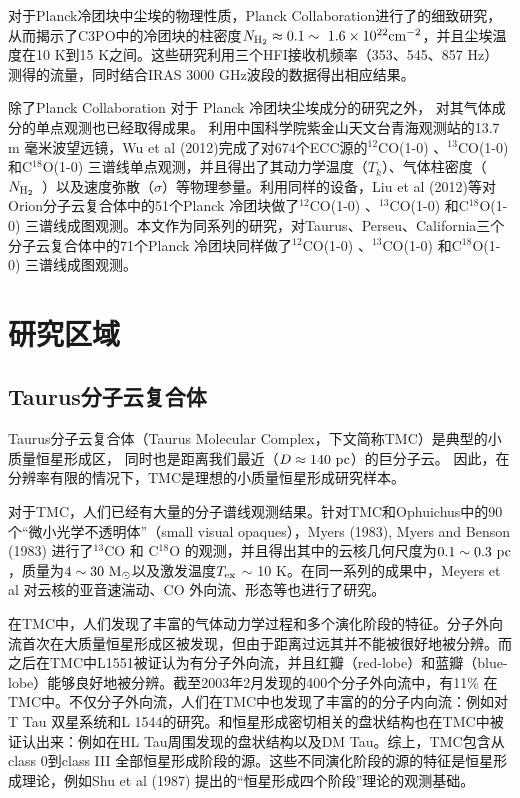 \documentclass[UTF8]{pkuthss}
\newcommand{\cob}{$^{13}$CO }
\newcommand{\coc}{C$^{18}$O }
\newcommand{\coaa}{$^{12}$CO(1-0) }
\newcommand{\cobb}{$^{13}$CO(1-0) }
\newcommand{\cocc}{C$^{18}$O(1-0) }
\newcommand{\texc}{$T_{\rm {ex}}$ }
\newcommand{\nhyd}{$N_{\rm H_2}$\ }
\begin{document}
		对于Planck冷团块中尘埃的物理性质，Planck Collaboration进行了的细致研究，从而揭示了C3PO中的冷团块的柱密度$N_ {\rm H_2} \approx 0.1 \rm \sim \ 1.6 \times 10^{22} \rm cm^{-2}$，并且尘埃温度在10 K到15 K之间\supercite{2011A&A...536A..23P}。这些研究利用三个HFI接收机频率（353、545、857 Hz）测得的流量，同时结合IRAS 3000 GHz波段的数据得出相应结果\supercite{2011A&A...536A..23P,2011A&A...536A..22P}。

		除了Planck Collaboration 对于 Planck 冷团块尘埃成分的研究之外， 对其气体成分的单点观测也已经取得成果。 利用中国科学院紫金山天文台青海观测站的13.7 m 毫米波望远镜，Wu et al (2012)完成了对674个ECC源的\coaa 、\cobb  和\cocc  三谱线单点观测，并且得出了其动力学温度（$T_k$）、气体柱密度（\nhyd）以及速度弥散（$\sigma$）等物理参量\supercite{wu2012gas}。利用同样的设备，Liu et al (2012)等对Orion分子云复合体中的51个Planck 冷团块做了\coaa 、\cobb  和\cocc  三谱线成图观测\supercite{LiuTie}。本文作为同系列的研究，对Taurus、Perseu、California三个分子云复合体中的71个Planck 冷团块同样做了\coaa 、\cobb  和\cocc  三谱线成图观测。

	\section{研究区域}

		\subsection{Taurus分子云复合体}

			Taurus分子云复合体（Taurus Molecular Complex，下文简称TMC）是典型的小质量恒星形成区， 同时也是距离我们最近（$D\approx 140\rm\ pc$）的巨分子云\supercite{1987ApJ...322..706D}。 因此，在分辨率有限的情况下，TMC是理想的小质量恒星形成研究样本。

			对于TMC，人们已经有大量的分子谱线观测结果。针对TMC和Ophuichus中的90个“微小光学不透明体”（small visual opaques），Myers (1983), Myers and Benson (1983) 进行了\cob 和 \coc 的观测，并且得出其中的云核几何尺度为$0.1\sim0.3 \ \rm pc$，质量为$4\sim30\ \rm M_\odot$以及激发温度\texc $\sim$ 10 K\supercite{1983ApJ...264..517M,1983ApJ...266..309M}。在同一系列的成果中，Meyers et al 对云核的亚音速湍动、CO 外向流、形态等也进行了研究\supercite{1983ApJ...270..105M,1988ApJ...324..907M,1991ApJ...376..561M}。

			在TMC中，人们发现了丰富的气体动力学过程和多个演化阶段的特征。分子外向流首次在大质量恒星形成区被发现，但由于距离过远其并不能被很好地被分辨\supercite{1976ApJ...209L.137Z}。而之后在TMC中L1551被证认为有分子外向流，并且红瓣（red-lobe）和蓝瓣（blue-lobe）能够良好地被分辨\supercite{1980ApJ...239L..17S}。截至2003年2月发现的400个分子外向流中，有11\% 在TMC中\supercite{2004A&A...426..503W}。不仅分子外向流，人们在TMC中也发现了丰富的的分子内向流：例如对T Tau 双星系统\supercite{1994ApJ...425L..45V}和L 1544的研究\supercite{1998ApJ...504..900T}。和恒星形成密切相关的盘状结构也在TMC中被证认出来：例如在HL Tau周围发现的盘状结构\supercite{1991ApJ...382L..31S}以及DM Tau\supercite{1995ApJ...453..384S}。综上，TMC包含从class 0到class III 全部恒星形成阶段的源。这些不同演化阶段的源的特征是恒星形成理论，例如Shu et al (1987) 提出的“恒星形成四个阶段”理论\supercite{shu1987star}的观测基础。
\end{document}
